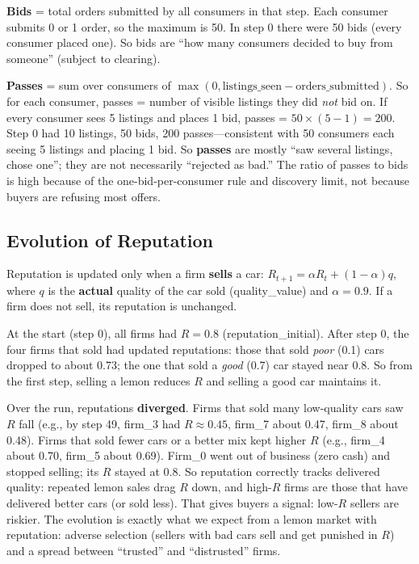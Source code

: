 \documentclass{article}
\begin{document}
\textbf{Bids} = total orders submitted by all consumers in that step. Each consumer submits 0 or 1 order, so the maximum is 50. In step 0 there were 50 bids (every consumer placed one). So bids are ``how many consumers decided to buy from someone'' (subject to clearing).

\textbf{Passes} = sum over consumers of \(\max(0, \text{listings\_seen} - \text{orders\_submitted})\). So for each consumer, passes = number of visible listings they did \emph{not} bid on. If every consumer sees 5 listings and places 1 bid, passes = \(50 \times (5 - 1) = 200\). Step 0 had 10 listings, 50 bids, 200 passes---consistent with 50 consumers each seeing 5 listings and placing 1 bid. So \textbf{passes} are mostly ``saw several listings, chose one''; they are not necessarily ``rejected as bad.'' The ratio of passes to bids is high because of the one-bid-per-consumer rule and discovery limit, not because buyers are refusing most offers.

\subsection{Evolution of Reputation}

Reputation is updated only when a firm \textbf{sells} a car: \(R_{t+1} = \alpha R_t + (1 - \alpha) q\), where \(q\) is the \textbf{actual} quality of the car sold (quality\_value) and \(\alpha = 0.9\). If a firm does not sell, its reputation is unchanged.

At the start (step 0), all firms had \(R = 0.8\) (reputation\_initial). After step 0, the four firms that sold had updated reputations: those that sold \emph{poor} (0.1) cars dropped to about 0.73; the one that sold a \emph{good} (0.7) car stayed near 0.8. So from the first step, selling a lemon reduces \(R\) and selling a good car maintains it.

Over the run, reputations \textbf{diverged}. Firms that sold many low-quality cars saw \(R\) fall (e.g., by step 49, firm\_3 had \(R \approx 0.45\), firm\_7 about 0.47, firm\_8 about 0.48). Firms that sold fewer cars or a better mix kept higher \(R\) (e.g., firm\_4 about 0.70, firm\_5 about 0.69). Firm\_0 went out of business (zero cash) and stopped selling; its \(R\) stayed at 0.8. So reputation correctly tracks delivered quality: repeated lemon sales drag \(R\) down, and high-\(R\) firms are those that have delivered better cars (or sold less). That gives buyers a signal: low-\(R\) sellers are riskier. The evolution is exactly what we expect from a lemon market with reputation: adverse selection (sellers with bad cars sell and get punished in \(R\)) and a spread between ``trusted'' and ``distrusted'' firms.
\end{document}
